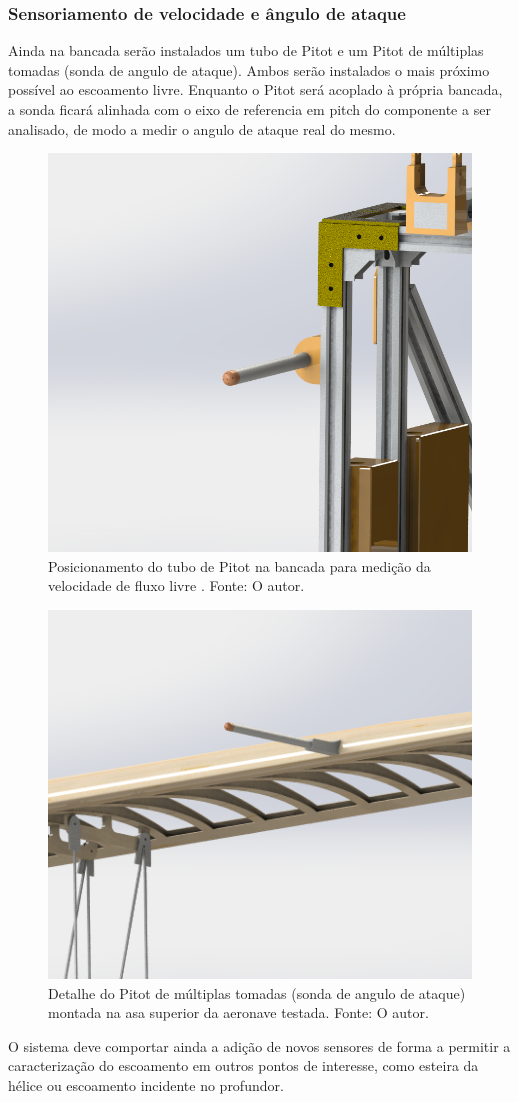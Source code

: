 \subsubsection{Sensoriamento de velocidade e ângulo de ataque}

Ainda na bancada serão instalados um tubo de Pitot e um Pitot de múltiplas tomadas (sonda de angulo de ataque). Ambos serão instalados o mais próximo possível ao escoamento livre. Enquanto o Pitot será acoplado à própria bancada, a sonda ficará alinhada com o eixo de referencia em pitch do componente a ser analisado, de modo a medir o angulo de ataque real do mesmo. 

\begin{figure}[!ht]
    \centering
    \includegraphics[width=.4\linewidth]{figuras/renders/detalhe_pitot_bancada.png}
    \caption{Posicionamento do tubo de Pitot na bancada para medição da velocidade de fluxo livre . Fonte: O autor.}
    \label{fig:placeholder}
\end{figure}

\begin{figure}[!ht]
    \centering
    \includegraphics[width=.5\linewidth]{figuras/renders/sonda_aoa_asa_superior.png}
    \caption{Detalhe do Pitot de múltiplas tomadas (sonda de angulo de ataque) montada na asa superior da aeronave testada. Fonte: O autor.}
    \label{fig:pitot_asa}
\end{figure}

O sistema deve comportar ainda a adição de novos sensores de forma a permitir a caracterização do escoamento em outros pontos de interesse, como esteira da hélice ou escoamento incidente no profundor.


